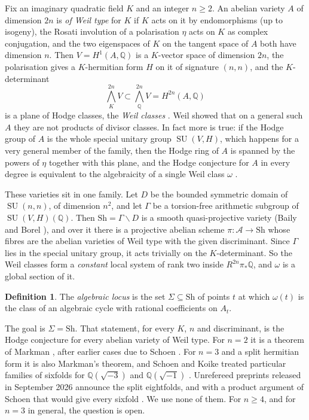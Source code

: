 \documentclass[11pt]{amsart}
\theoremstyle{definition}
\newtheorem{definition}[theorem]{Definition}
\theoremstyle{remark}
\newcommand{\QQ}{\mathbb{Q}}
\newcommand{\SU}{\operatorname{SU}}
\newcommand{\Sh}{\mathrm{Sh}}
\begin{document}
Fix an imaginary quadratic field $K$ and an integer $n\ge2$. An abelian
variety $A$ of dimension $2n$ is \emph{of Weil type} for $K$ if $K$ acts on
it by endomorphisms (up to isogeny), the Rosati involution of a
polarisation $\eta$ acts on $K$ as complex conjugation, and the two
eigenspaces of $K$ on the tangent space of $A$ both have dimension $n$.
Then $V=H^{1}(A,\QQ)$ is a $K$-vector space of dimension $2n$, the
polarisation gives a $K$-hermitian form $H$ on it of signature $(n,n)$, and
the $K$-determinant
\[
  \textstyle\bigwedge^{2n}_{K}V\subset\bigwedge^{2n}_{\QQ}V=H^{2n}(A,\QQ)
\]
is a plane of Hodge classes, the \emph{Weil classes} \cite{Weil77}. Weil
showed that on a general such $A$ they are not products of divisor
classes. In fact more is true: if the Hodge group of $A$ is the whole
special unitary group $\SU(V,H)$, which happens for a very general member
of the family, then the Hodge ring of $A$ is spanned by the powers of
$\eta$ together with this plane, and the Hodge conjecture for $A$ in every
degree is equivalent to the algebraicity of a single Weil class $\omega$
\cite{MZ99,BhH8}.

These varieties sit in one family. Let $D$ be the bounded symmetric domain
of $\SU(n,n)$, of dimension $n^{2}$, and let $\Gamma$ be a torsion-free
arithmetic subgroup of $\SU(V,H)(\QQ)$. Then $\Sh=\Gamma\backslash D$ is a
smooth quasi-projective variety (Baily and Borel \cite{BB66}), and over it
there is a projective abelian scheme $\pi\colon\mathcal A\to\Sh$ whose
fibres are the abelian varieties of Weil type with the given discriminant.
Since $\Gamma$ lies in the special unitary group, it acts trivially on the
$K$-determinant. So the Weil classes form a \emph{constant} local system
of rank two inside $R^{2n}\pi_{*}\QQ$, and $\omega$ is a global section of
it.

\begin{definition}
The \emph{algebraic locus} is the set $\Sigma\subseteq\Sh$ of points $t$
at which $\omega(t)$ is the class of an algebraic cycle with rational
coefficients on $A_{t}$.
\end{definition}

The goal is $\Sigma=\Sh$. That statement, for every $K$, $n$ and
discriminant, is the Hodge conjecture for every abelian variety of Weil
type. For $n=2$ it is a theorem of Markman \cite{Mar25a,Mar25b}, after
earlier cases due to Schoen \cite{Sch88,Sch98}. For $n=3$
and a split hermitian form it is also Markman's theorem, and Schoen and
Koike treated particular families of sixfolds for $\QQ(\sqrt{-3})$ and
$\QQ(\sqrt{-1})$ \cite{Sch88,Koi04}. Unrefereed preprints released in
September 2026 announce the split eightfolds, and with a product argument
of Schoen that would give every sixfold \cite{BhH8}. We use none of them.
For $n\ge4$, and for $n=3$ in general, the question is open.
\end{document}
